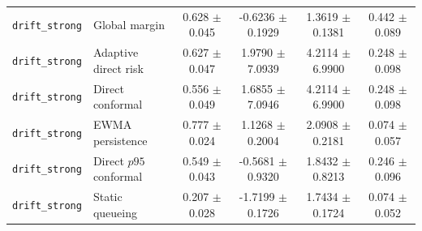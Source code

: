 \begin{tabular}{llcccc}
\texttt{drift\_strong} & Global margin & 0.628 $\pm$ 0.045 & -0.6236 $\pm$ 0.1929 & 1.3619 $\pm$ 0.1381 & 0.442 $\pm$ 0.089 \\
\texttt{drift\_strong} & Adaptive direct risk & 0.627 $\pm$ 0.047 & 1.9790 $\pm$ 7.0939 & 4.2114 $\pm$ 6.9900 & 0.248 $\pm$ 0.098 \\
\texttt{drift\_strong} & Direct conformal & 0.556 $\pm$ 0.049 & 1.6855 $\pm$ 7.0946 & 4.2114 $\pm$ 6.9900 & 0.248 $\pm$ 0.098 \\
\texttt{drift\_strong} & EWMA persistence & 0.777 $\pm$ 0.024 & 1.1268 $\pm$ 0.2004 & 2.0908 $\pm$ 0.2181 & 0.074 $\pm$ 0.057 \\
\texttt{drift\_strong} & Direct $p95$ conformal & 0.549 $\pm$ 0.043 & -0.5681 $\pm$ 0.9320 & 1.8432 $\pm$ 0.8213 & 0.246 $\pm$ 0.096 \\
\texttt{drift\_strong} & Static queueing & 0.207 $\pm$ 0.028 & -1.7199 $\pm$ 0.1726 & 1.7434 $\pm$ 0.1724 & 0.074 $\pm$ 0.052 \\
\hline
\end{tabular}

